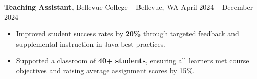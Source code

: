 \documentclass[11pt]{article}       %
\begin{document}

\textbf{Teaching Assistant,} {Bellevue College} -- Bellevue, WA \hfill April 2024 -- December 2024 \\
\vspace{-9pt}
\begin{itemize}
  \item Improved student success rates by \textbf{20\%} through targeted feedback and supplemental instruction in Java best practices.
  \item Supported a classroom of \textbf{40+ students}, ensuring all learners met course objectives and raising average assignment scores by 15\%.
\end{itemize}
\end{document}
